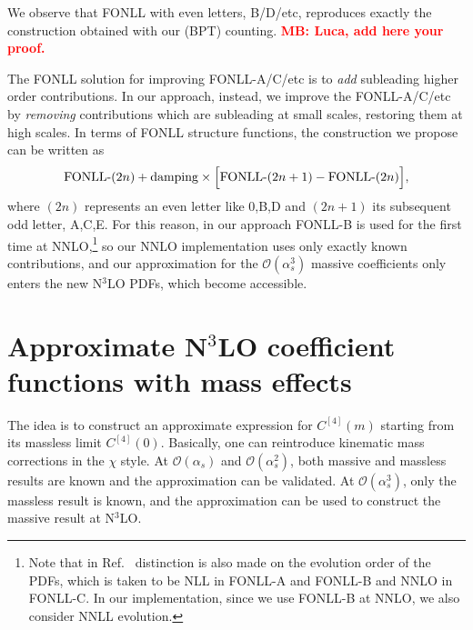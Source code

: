 \documentclass[a4paper,10pt]{article}
\newcommand{\as}{\alpha_s}
\newcommand{\Ord}{\mathcal{O}}
\newcommand{\FONLL}[1]{\text{FONLL-#1}}
\def\beq{\begin{equation}}
\def\eeq{\end{equation}}
\newcommand{\MB}[1]{\textbf{\textcolor{red}   {MB: #1}}}
\begin{document}
We observe that FONLL with even letters, B/D/etc, reproduces exactly the construction obtained with our (BPT) counting.
\MB{Luca, add here your proof.}

The FONLL solution for improving FONLL-A/C/etc is to \emph{add} subleading higher order contributions.
In our approach, instead, we improve the FONLL-A/C/etc by \emph{removing} contributions which are
subleading at small scales, restoring them at high scales.
In terms of FONLL structure functions, the construction we propose can be written as
\beq
\FONLL{}(2n) + {\rm damping}\times\Big[\FONLL{}(2n+1)-\FONLL{}(2n)\Big],
\eeq
where $(2n)$ represents an even letter like 0,B,D and $(2n+1)$ its subsequent odd letter, A,C,E.
For this reason, in our approach FONLL-B is used for the first time at NNLO,\footnote
{Note that in Ref.~\cite{Forte:} distinction is also made on the evolution order of the PDFs,
  which is taken to be NLL in FONLL-A and FONLL-B and NNLO in FONLL-C. In our implementation, since
we use FONLL-B at NNLO, we also consider NNLL evolution.}
so our NNLO implementation uses only exactly known contributions,
and our approximation for the $\Ord(\as^3)$ massive coefficients only enters the new N$^3$LO PDFs,
which become accessible.





\section{\boldmath Approximate N$^3$LO coefficient functions with mass effects}
\label{sec:approx}

The idea is to construct an approximate expression for $C^{[4]}(m)$ starting from its massless limit $C^{[4]}(0)$.
Basically, one can reintroduce kinematic mass corrections in the $\chi$ style.
At $\Ord(\as)$ and $\Ord(\as^2)$, both massive and massless results are known and the approximation can be validated.
At $\Ord(\as^3)$, only the massless result is known, and the approximation can be used to construct the massive
result at N$^3$LO.
\end{document}
